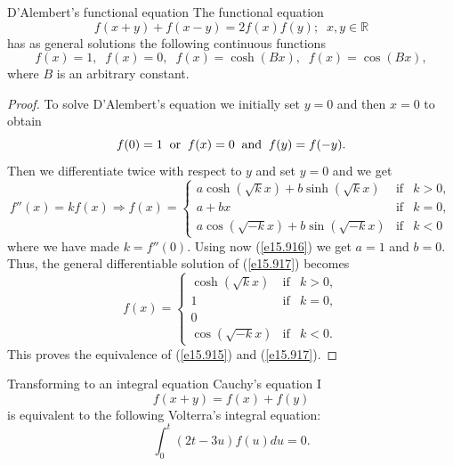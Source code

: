 \documentclass[
	11pt, %
	fleqn, %
	a4paper, %
]{LegrandOrangeBook}
\newcommand{\R}{\mathbb{R}}
\begin{document}
\begin{theorem}{D'Alembert's functional equation}
\label{th2.14}
The functional equation
\begin{equation}\label{e15.915}
f(x+y)+f(x-y)=2f(x)f(y);\;\;x,y\in \R
\end {equation}
has as general solutions the following continuous functions
\begin{equation}
f(x)=1,\;\;f(x)=0,\;\;f(x)=\cosh (Bx),\;\;f(x)=\cos (Bx),
\end {equation}
where $B$ is an arbitrary constant.
\end{theorem}
\begin{proof}
To solve D'Alembert's equation we initially set $y=0$ and then $x=0$ to obtain
\begin{equation}\label{e15.916}
f(0)=1\;\;{\rm or}\;\;f(x)=0\;\;{\rm and}\;\;f(y)=f(-y).
\end{equation}
Then we differentiate twice with respect to $y$ and set $y=0$ and we get
\begin{equation}\label{e15.917}
f''(x)=kf(x)\Rightarrow  f(x)=\left\{ \begin{array}{lll}
a\cosh(\sqrt{k}x)+b\sinh(\sqrt{k}x) & \text{if} & k>0,\\
a+bx & \text{if} & k=0,\\
a\cos(\sqrt{-k}x)+b\sin(\sqrt{-k}x) & \text{if} & k<0
\end{array} \right.
\end{equation}
where we have made $k=f''(0)$. Using now (\ref{e15.916}) we get $a=1$ and $b=0$. Thus, the general
differentiable solution of (\ref{e15.917}) becomes
\begin{equation}
f(x)=\left\{ \begin{array}{lll}
\cosh (\sqrt kx)&\mbox{if}&k>0,\\
1&\mbox{if}&k=0,\\
0\\
\cos (\sqrt {-k}x)&\mbox{if}&k<0.
\end{array}
\right.
\end{equation}
This proves the equivalence of (\ref{e15.915}) and (\ref{e15.917}).
\end{proof}

\begin{example}{Transforming to an integral equation}
Cauchy's equation I
\begin{displaymath}
f(x+y)=f(x)+f(y)
\end{displaymath}
is equivalent to the following Volterra's integral equation:
\begin{displaymath} \int_0^t(2t-3u)f(u)du=0.
\end{displaymath}
\end{example}
\end{document}
